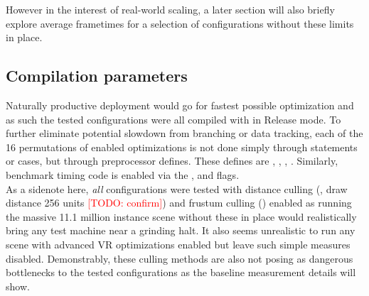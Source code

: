 However in the interest of real-world scaling, a later section will also briefly explore average frametimes for a selection of configurations without these limits in place. 

\subsection{Compilation parameters}
Naturally productive deployment would go for fastest possible optimization and as such the tested configurations were all compiled with  in Release mode. 
To further eliminate potential slowdown from branching or data tracking, each of the 16 permutations of enabled optimizations is not done simply through  statements or  cases, but through preprocessor defines. These defines are , , , . Similarly, benchmark timing code is enabled via the ,  and  flags. \\
As a sidenote here, \textit{all} configurations were tested with distance culling (, draw distance 256 units \textcolor{red}{[TODO: confirm]}) and frustum culling () enabled as running the massive 11.1 million instance scene without these in place would realistically bring any test machine near a grinding halt. It also seems unrealistic to run any scene with advanced VR optimizations enabled but leave such simple measures disabled. 
Demonstrably, these culling methods are also not posing as dangerous bottlenecks to the tested configurations as the baseline measurement details will show. 

